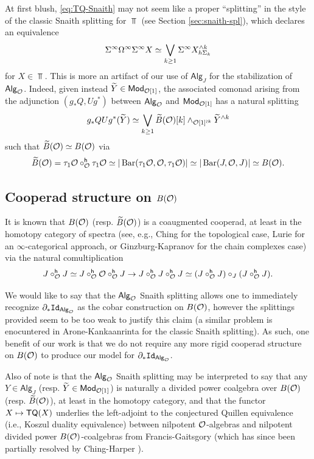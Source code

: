\begin{remark} 
    At first blush, \eqref{eq:TQ-Snaith} may not seem like a proper ``splitting'' in the style of the classic Snaith splitting for $\Top$ (see Section \ref{sec:snaith-spl}), which declares an equivalence \[ \Sigma^{\infty} \Omega^{\infty} \Sigma^{\infty} X\simeq \bigvee_{k\geq 1} \Sigma^{\infty} X^{\wedge k}_{h\Sigma_k}\] for $X\in \Top$. This is more an artifact of our use of $\mathsf{Alg}_J$ for the stabilization of ${\mathsf{Alg}_{\mathcal{O}}}$. Indeed, given instead $\widetilde{Y}\in \mathsf{Mod}_{\mathcal{O}[1]}$, the associated comonad arising from the adjunction $(g_*Q, Ug^*)$ between ${\mathsf{Alg}_{\mathcal{O}}}$ and $\mathsf{Mod}_{\mathcal{O}[1]}$ has a natural splitting \[
    g_* Q Ug^* (\widetilde{Y})\simeq \bigvee_{k\geq 1} \widetilde{B}(\mathcal{O})[k] \wedge_{\mathcal{O}[1]^{\wr k}} \widetilde{Y}^{\wedge k}\]
    such that $\widetilde{B}(\mathcal{O})\simeq B(\mathcal{O})$ via \[\widetilde{B}(\mathcal{O})= \tau_1\mathcal{O} \circ^{\mathsf{h}}_{\mathcal{O}} \tau_1 \mathcal{O} \simeq |\operatorname{Bar}(\tau_1\mathcal{O}, \mathcal{O}, \tau_1\mathcal{O})| \simeq |\operatorname{Bar}(J,\mathcal{O},J)|\simeq B(\mathcal{O}).\]
\end{remark}
    
\subsection{Cooperad structure on $B(\mathcal{O})$} \label{B(O)} It is known that $B(\mathcal{O})$ (resp. $\widetilde{B}(\mathcal{O})$) is a coaugmented cooperad, at least in the homotopy category of spectra (see, e.g.,  Ching \cite{Ching-thesis} for the topological case, Lurie \cite[]{Lur} for an $\infty$-categorical approach, or Ginzburg-Kapranov \cite{Ginz-Kap} for the chain complexes case) via the natural comultiplication  \[ J \circ^{\mathsf{h}}_{\mathcal{O}} J \simeq J \circ^{\mathsf{h}}_{\mathcal{O}} \mathcal{O} \circ^{\mathsf{h}}_{\mathcal{O}} J \to J \circ^{\mathsf{h}}_{\mathcal{O}} J \circ^{\mathsf{h}}_{\mathcal{O}} J \simeq (J \circ^{\mathsf{h}}_{\mathcal{O}} J) \circ_J (J \circ^{\mathsf{h}}_{\mathcal{O}} J) .\]
    
    We would like to say that the ${\mathsf{Alg}_{\mathcal{O}}}$ Snaith splitting allows one to immediately recognize $\partial_* \mathtt{Id}_{{\mathsf{Alg}_{\mathcal{O}}}}$ as the cobar construction on $B(\mathcal{O})$, however the splittings provided seem to be too weak to justify this claim (a similar problem is enocuntered in Arone-Kankaanrinta \cite{AK} for the classic Snaith splitting). As such, one benefit of our work is that we do not require any more rigid cooperad structure on $B(\mathcal{O})$ to produce our model for $\partial_* \mathtt{Id}_{{\mathsf{Alg}_{\mathcal{O}}}}$. 
    
    Also of note is that the ${\mathsf{Alg}_{\mathcal{O}}}$ Snaith splitting may be interpreted to say that any $Y\in \mathsf{Alg}_J$ (resp. $\widetilde{Y}\in \mathsf{Mod}_{\mathcal{O}[1]}$) is naturally a divided power coalgebra over $B(\mathcal{O})$ (resp. $\widetilde{B}(\mathcal{O})$), at least in the homotopy category, and that the functor $X\mapsto \mathsf{TQ}(X)$ underlies the left-adjoint to the conjectured Quillen equivalence (i.e., Koszul duality equivalence) between nilpotent $\mathcal{O}$-algebras and nilpotent divided power $B(\mathcal{O})$-coalgebras from Francis-Gaitsgory \cite{FG} (which has since been partially resolved by Ching-Harper \cite{Ching-Harper-Koszul}). 

